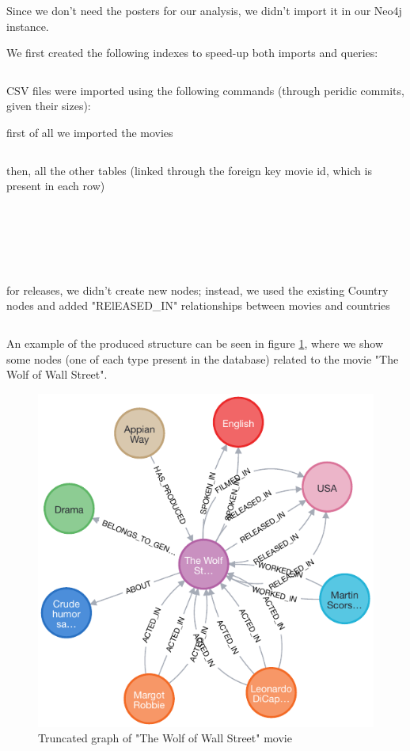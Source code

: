 \documentclass{Configuration_Files/PoliMi3i_thesis}
\begin{document}
Since we don't need the posters for our analysis, we didn't import it in our Neo4j instance.

We first created the following indexes to speed-up both imports and queries:

\inputminted[frame=single,framesep=10pt,breaklines]{cypher}{letterboxd/import/index.cypher}

CSV files were imported using the following commands (through peridic commits, given their sizes):

first of all we imported the movies

\inputminted[frame=single,framesep=10pt,breaklines]{cypher}{letterboxd/import/movies.cypher}

then, all the other tables (linked through the foreign key movie id, which is present in each row)

\inputminted[frame=single,framesep=10pt,breaklines]{cypher}{letterboxd/import/actors.cypher}
\inputminted[frame=single,framesep=10pt,breaklines]{cypher}{letterboxd/import/crew.cypher}
\inputminted[frame=single,framesep=10pt,breaklines]{cypher}{letterboxd/import/languages.cypher}
\inputminted[frame=single,framesep=10pt,breaklines]{cypher}{letterboxd/import/studio.cypher}
\inputminted[frame=single,framesep=10pt,breaklines]{cypher}{letterboxd/import/country.cypher}
\inputminted[frame=single,framesep=10pt,breaklines]{cypher}{letterboxd/import/genre.cypher}
\inputminted[frame=single,framesep=10pt,breaklines]{cypher}{letterboxd/import/theme.cypher}

for releases, we didn't create new nodes; instead, we used the existing Country nodes and added "RElEASED\_IN" relationships between movies and countries

\inputminted[frame=single,framesep=10pt,breaklines]{cypher}{letterboxd/import/release.cypher}

An example of the produced structure can be seen in figure \ref{fig:graph_example}, where we show some nodes (one of each type present in the database) related to the movie "The Wolf of Wall Street".
\newpage
\begin{figure}[!h]
    \centering
    \includegraphics[width=0.6\linewidth]{latex/letterboxd/graph_example.pdf}
    \caption{Truncated graph of "The Wolf of Wall Street" movie}
    \label{fig:graph_example}
\end{figure}
\end{document}
